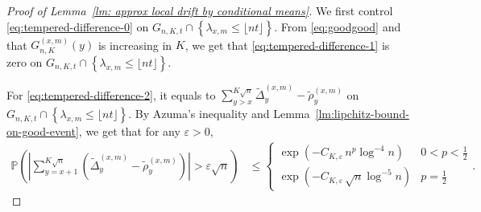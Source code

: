 \documentclass[EJP]{ejpecp} %
\begin{document}
\begin{proof}[Proof of Lemma~\ref{lm: approx local drift by conditional means}]
	We first control \eqref{eq:tempered-difference-0} on $G_{n, K, t} \cap \left\{\lambda_{x,m} \leq\lfloor nt \rfloor \right\}$. From \eqref{eq:goodgood} and that $G_{n,K}^{(x,m)}(y)$ is increasing in $K$, we get that  \eqref{eq:tempered-difference-1} is zero on $G_{n, K, t} \cap \left\{\lambda_{x,m} \leq\lfloor nt \rfloor \right\}$. 
	
	For \eqref{eq:tempered-difference-2}, it equals to
	$
	\sum_{y > x}^{K\sqrt{n}} \tilde \Delta_{y}^{(x,m)} - \tilde\rho_y^{(x,m)}
	$
	on $G_{n, K, t} \cap \left\{\lambda_{x,m} \leq\lfloor nt \rfloor \right\}$. By Azuma's inequality and Lemma~\ref{lm:lipchitz-bound-on-good-event}, we get that for any $\varepsilon>0$,
	\begin{align}
		\mathbb{P}\left( \left| \sum_{y = x + 1}^{K \sqrt{n} } (\tilde\Delta_y^{(x,m)} - \tilde\rho_y^{(x,m)}) \right| > \varepsilon \sqrt{n}  \right) 
		&
		\label{eq:azuma-drift-martingale}
		\le \begin{cases}
			\exp\left( - C_{K, \varepsilon} \, n^{p } \log^{-4} n \right)
			& 0 < p < \frac{1}{2} \\
			\exp\left( - C_{K, \varepsilon} \, \sqrt{n}  \log^{-5} n \right)
			& p = \frac{1}{2}
		\end{cases}
		.\end{align}
	

\end{proof}
\end{document}
